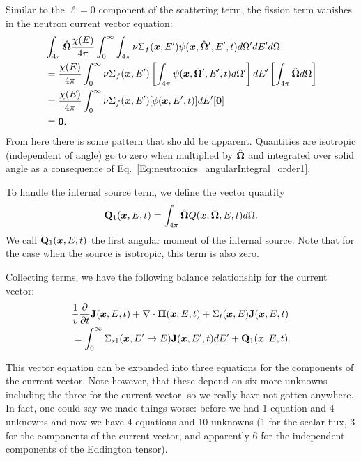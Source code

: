 Similar to the $\ell = 0$ component of the scattering term, the fission term vanishes in the neutron current vector equation:
\begin{align}
  &\int_{4\pi} \hat{\mathbf{\Omega}} \frac{\chi(E)}{4\pi} \int_0^\infty \int_{4\pi}  \nu \Sigma_f(\bm{x},E') \psi(\bm{x},\hat{\mathbf{\Omega}}',E',t) d\Omega' dE' d\Omega \nonumber \\
  &= \frac{\chi(E)}{4\pi} \int_0^\infty \nu \Sigma_f(\bm{x},E') \left[ \int_{4\pi}  \psi(\bm{x},\hat{\mathbf{\Omega}}',E',t) d\Omega' \right] dE' \left[ \int_{4\pi} \hat{\mathbf{\Omega}} d\Omega \right] \nonumber \\
  &= \frac{\chi(E)}{4\pi} \int_0^\infty \nu \Sigma_f(\bm{x},E') [ \phi(\bm{x},E',t) ] dE'  [ \mathbf{0} ] \nonumber \\*
  &= \mathbf{0} . \nonumber
\end{align}
From here there is some pattern that should be apparent. Quantities are isotropic (independent of angle) go to zero when multiplied by $\hat{\mathbf{\Omega}}$ and integrated over solid angle as a consequence of Eq.~\eqref{Eq:neutronics_angularIntegral_order1}.

To handle the internal source term, we define the vector quantity
\begin{align}
  \mathbf{Q}_1(\bm{x},E,t) = \int_{4\pi} \hat{\mathbf{\Omega}}  Q(\bm{x},\hat{\mathbf{\Omega}},E,t) d\Omega .
\end{align}
We call $\mathbf{Q}_1(\bm{x},E,t)$ the first angular moment of the internal source. Note that for the case when the source is isotropic, this term is also zero.

Collecting terms, we have the following balance relationship for the current vector:
\begin{align}
  &\frac{1}{v} \frac{ \partial {} }{ \partial {t} } \mathbf{J}(\bm{x},E,t) + \nabla \cdot \boldsymbol\Pi(\bm{x},E,t) + \Sigma_t(\bm{x},E) \mathbf{J}(\bm{x},E,t) \nonumber \\*
  &= \int_0^\infty \Sigma_{s1}(\bm{x}, E' \rightarrow E ) \mathbf{J}(\bm{x},E',t) dE'  + \mathbf{Q}_1(\bm{x},E,t) .
\end{align}

This vector equation can be expanded into three equations for the components of the current vector. Note however, that these depend on six more unknowns including the three for the current vector, so we really have not gotten anywhere. In fact, one could say we made things worse: before we had 1 equation and 4 unknowns and now we have 4 equations and 10 unknowns (1 for the scalar flux, 3 for the components of the current vector, and apparently 6 for the independent components of the Eddington tensor). 

